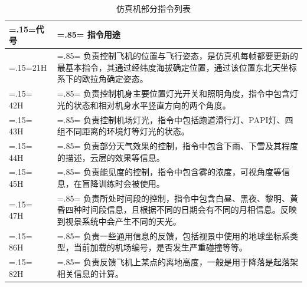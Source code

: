 \begin{table}[h!]
    \begin{center}
        \caption{仿真机部分指令列表}
        \label{caecommand}
        \renewcommand\arraystretch{1.5}
        \begin{tabularx}{0.8\textwidth}{ 
            | >{\centering\arraybackslash\hsize=.15\hsize\linewidth=\hsize}X 
            | >{\raggedright\arraybackslash\hsize=.85\hsize\linewidth=\hsize}X 
            | }
            \hline
            \textbf{代号} & \textbf{指令用途}\\
            \hline
            21H &  负责控制飞机的位置与飞行姿态，是仿真机每帧都要更新的最基本指令，其通过经纬度海拔确定位置，通过该位置东北天坐标系下的欧拉角确定姿态。\\
            \hline
            42H &  负责控制机身主要位置灯光开关和照明角度，指令中包含灯光的状态和相对机身水平竖直方向的两个角度。\\
            \hline
            43H &  负责控制机场灯光，指令中包括跑道滑行灯、PAPI灯、四组不同距离的环境灯等灯光的状态。\\
            \hline
            44H &  负责部分天气效果的控制，指令中包含下雨、下雪及其程度的描述，云层的效果等信息。\\
            \hline
            45H &  负责能见度的控制，指令中包含雾的浓度，可视角度等信息，在盲降训练时会被使用。\\
            \hline
            47H &  负责所处时间段的控制，指令中包含白昼、黑夜、黎明、黄昏四种时间段信息，且根据不同的日期会有不同的月相信息。反映到视景系统中会产生不同的天光。\\
            \hline
            86H &  负责一些通用信息的反馈，包括视景中使用的地球坐标系类型，当前加载的机场编号，是否发生严重碰撞等等。\\
            \hline
            82H &  负责反馈飞机上某点的离地高度，一般是用于降落是起落架相关信息的计算。\\
            \hline
        \end{tabularx}
    \end{center}
\end{table}
